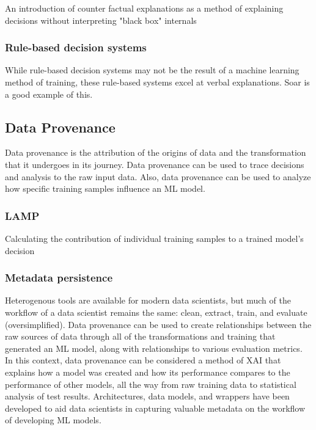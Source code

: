 An introduction of counter factual explanations as a method of explaining decisions without interpreting "black box" internals \cite{DBLP:journals/corr/abs-1711-00399}

\subsubsection{Rule-based decision systems}

While rule-based decision systems may not be the result of a machine learning method of training, these rule-based systems excel at verbal explanations.  Soar is a good example of this.

\subsection{Data Provenance}

Data provenance is the attribution of the origins of data and the transformation that it undergoes in its journey.  Data provenance can be used to trace decisions and analysis to the raw input data.  Also, data provenance can be used to analyze how specific training samples influence an ML model.

\subsubsection{LAMP}

Calculating the contribution of individual training samples to a trained model's decision \cite{Ma2017}

\subsubsection{Metadata persistence} Heterogenous tools are available for modern data scientists, but much of the workflow of a data scientist remains the same:  clean, extract, train, and evaluate (oversimplified).  Data provenance can be used to create relationships between the raw sources of data through all of the transformations and training that generated an ML model, along with relationships to various evaluation metrics.  In this context, data provenance can be considered a method of XAI that explains how a model was created and how its performance compares to the performance of other models, all the way from raw training data to statistical analysis of test results.  Architectures, data models, and wrappers have been developed to aid data scientists in capturing valuable metadata on the workflow of developing ML models.

